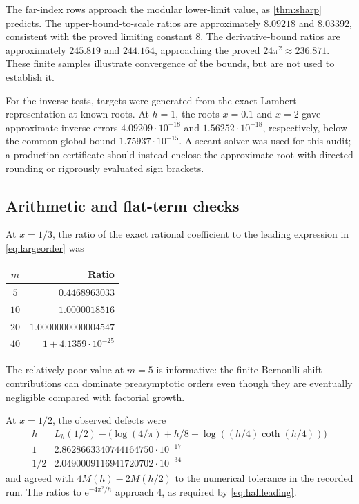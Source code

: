 \documentclass[11pt,a4paper]{article}
\numberwithin{equation}{section}
\theoremstyle{definition}
\newcommand{\ee}{\mathrm e}
\begin{document}
The far-index rows approach the modular lower-limit value, as \cref{thm:sharp} predicts. The upper-bound-to-scale ratios are approximately $8.09218$ and $8.03392$, consistent with the proved limiting constant $8$. The derivative-bound ratios are approximately $245.819$ and $244.164$, approaching the proved $24\pi^2\approx236.871$. These finite samples illustrate convergence of the bounds, but are not used to establish it.

For the inverse tests, targets were generated from the exact Lambert representation at known roots. At $h=1$, the roots $x=0.1$ and $x=2$ gave approximate-inverse errors $4.09209\cdot10^{-18}$ and $1.56252\cdot10^{-18}$, respectively, below the common global bound $1.75937\cdot10^{-15}$. A secant solver was used for this audit; a production certificate should instead enclose the approximate root with directed rounding or rigorously evaluated sign brackets.

\subsection{Arithmetic and flat-term checks}
At $x=1/3$, the ratio of the exact rational coefficient to the leading expression in \eqref{eq:largeorder} was
\begin{center}\small
\begin{tabular}{@{}cr@{}}\toprule
$m$&Ratio\\\midrule
$5$&$0.4468963033$\\
$10$&$1.0000018516$\\
$20$&$1.0000000000004547$\\
$40$&$1+4.1359\cdot10^{-25}$\\\bottomrule
\end{tabular}
\end{center}
The relatively poor value at $m=5$ is informative: the finite Bernoulli-shift contributions can dominate preasymptotic orders even though they are eventually negligible compared with factorial growth.

At $x=1/2$, the observed defects were
\[
\begin{array}{c|c}
h&L_h(1/2)-\bigl(\log(4/\pi)+h/8+\log((h/4)\coth(h/4))\bigr)\\\hline
1&2.8628663340744164750\cdot10^{-17}\\
1/2&2.0490009116941720702\cdot10^{-34}
\end{array}
\]
and agreed with $4M(h)-2M(h/2)$ to the numerical tolerance in the recorded run. The ratios to $\ee^{-4\pi^2/h}$ approach $4$, as required by \eqref{eq:halfleading}.
\end{document}
